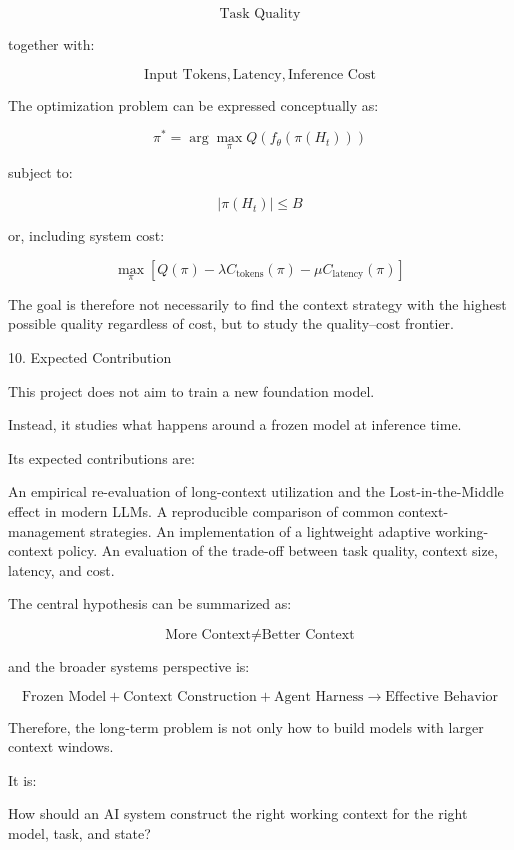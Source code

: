 $$ \boxed{ \text{Task Quality} } $$

together with:

$$ \boxed{ \text{Input Tokens}, \text{Latency}, \text{Inference Cost} } $$

The optimization problem can be expressed conceptually as:

$$ \pi^* = \arg\max_\pi Q\left( f_\theta(\pi(H_t)) \right) $$

subject to:

$$ |\pi(H_t)|\le B $$

or, including system cost:

$$ \boxed{ \max_\pi [ Q(\pi) -\lambda C_{\text{tokens}}(\pi) -\mu C_{\text{latency}}(\pi) ] } $$

The goal is therefore not necessarily to find the context strategy with the highest possible quality regardless of cost, but to study the quality–cost frontier.

10. Expected Contribution

This project does not aim to train a new foundation model.

Instead, it studies what happens around a frozen model at inference time.

Its expected contributions are:

An empirical re-evaluation of long-context utilization and the Lost-in-the-Middle effect in modern LLMs.
A reproducible comparison of common context-management strategies.
An implementation of a lightweight adaptive working-context policy.
An evaluation of the trade-off between task quality, context size, latency, and cost.

The central hypothesis can be summarized as:

$$ \boxed{ \text{More Context} \neq \text{Better Context} } $$

and the broader systems perspective is:

$$ \boxed{ \text{Frozen Model} + \text{Context Construction} + \text{Agent Harness} \rightarrow \text{Effective Behavior} } $$

Therefore, the long-term problem is not only how to build models with larger context windows.

It is:

How should an AI system construct the right working context for the right model, task, and state?